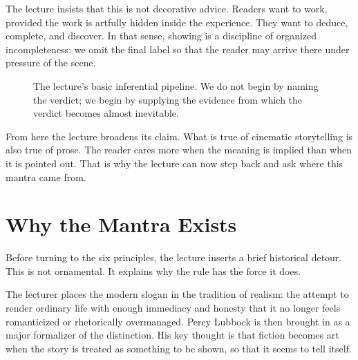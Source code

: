 The lecture insists that this is not decorative advice. Readers want to work, provided the work is artfully hidden inside the experience. They want to deduce, complete, and discover. In that sense, showing is a discipline of organized incompleteness: we omit the final label so that the reader may arrive there under pressure of the scene.

\begin{figure}[h]
\centering
{}
\caption{The lecture's basic inferential pipeline. We do not begin by naming the verdict; we begin by supplying the evidence from which the verdict becomes almost inevitable.}
\end{figure}

From here the lecture broadens its claim. What is true of cinematic storytelling is also true of prose. The reader cares more when the meaning is implied than when it is pointed out. That is why the lecture can now step back and ask where this mantra came from.

\section{Why the Mantra Exists}

Before turning to the six principles, the lecture inserts a brief historical detour. This is not ornamental. It explains why the rule has the force it does.

The lecturer places the modern slogan in the tradition of realism: the attempt to render ordinary life with enough immediacy and honesty that it no longer feels romanticized or rhetorically overmanaged. Percy Lubbock is then brought in as a major formalizer of the distinction. His key thought is that fiction becomes art when the story is treated as something to be shown, so that it seems to tell itself.

